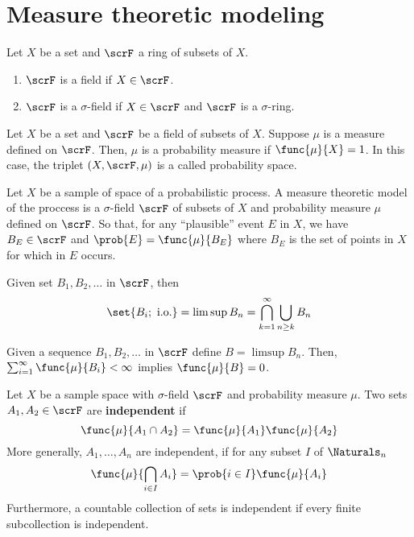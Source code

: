 \section{Measure theoretic modeling}
\begin{definition}
    Let \(X\) be a set and \(\scrF\) a ring of subsets of \(X\).
    \begin{enumerate}
        \item \(\scrF\) is a field if \(X \in \scrF\).
        \item \(\scrF\) is a \(\sigma\)-field if \(X \in \scrF\) and \(\scrF\) is a \(\sigma\)-ring.
    \end{enumerate}
\end{definition}

\begin{definition}
    Let \(X\) be a set and \(\scrF\) be a field of subsets of \(X\). Suppose \(\mu\) is a measure defined on \(\scrF\). Then, \(\mu\) is a probability measure if \(\func{\mu}{X} = 1\). In this case, the triplet \((X,\scrF,\mu)\) is a called probability space.
\end{definition}

Let \(X\) be a sample of space of a probabilistic process. A measure theoretic model of the proccess is a \(\sigma\)-field \(\scrF\) of subsets of \(X\) and probability measure \(\mu\) defined on \(\scrF\). So that, for any ``plausible'' event \(E\) in \(X\), we have \(B_E \in \scrF\) and \(\prob{E} =\func{\mu}{B_E}\) where \(B_E\) is the set of points in \(X\) for which in \(E\) occurs.

\begin{definition}
    Given set \(B_1, B_2 , \dots\) in \(\scrF\), then 
    \begin{equation*}
        \set{B_i; \ \mathrm{ i.o.}} = \limsup B_n = \bigcap_{k = 1}^{\infty} \bigcup_{n \geq k} B_n
    \end{equation*}
\end{definition}

\begin{theorem}
    Given a sequence \(B_1, B_2,\dots\) in \(\scrF\) define \(B = \limsup B_n\). Then, \(\sum_{i= 1}^{\infty} \func{\mu}{B_i} < \infty\) implies \(\func{\mu}{B} = 0\).
\end{theorem}

\begin{definition}
    Let \(X\) be a sample space with \(\sigma\)-field \(\scrF\) and probability measure \(\mu\). Two sets \(A_1,A_2 \in \scrF\) are \textbf{independent} if 
    \begin{equation*}
        \func{\mu}{A_1 \cap A_2} = \func{\mu}{A_1}\func{\mu}{A_2}
    \end{equation*}
    More generally, \(A_1, \dots, A_n\) are independent, if for any subset \(I\) of \(\Naturals_n\)
    \begin{equation*}
        \func{\mu}{\bigcap_{i \in I}A_i} = \prob{i \in I} \func{\mu}{A_i}
    \end{equation*}
    Furthermore, a countable collection of sets is independent if every finite subcollection is independent.
\end{definition}

